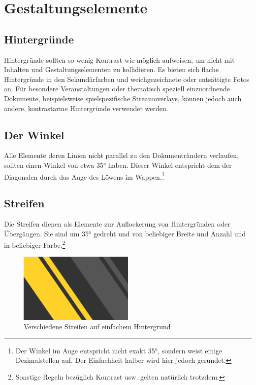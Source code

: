 \documentclass{article}
\begin{document}
\cleardoublepage
\section{Gestaltungselemente}

\subsection{Hintergründe}
Hintergründe sollten so wenig Kontrast wie möglich aufweisen, um nicht mit Inhalten und Gestaltungselementen zu kollidieren. Es bieten sich flache Hintergründe in den Sekundärfarben und weichgezeichnete oder entsättigte Fotos an. Für besondere Veranstaltungen oder thematisch speziell einzuordnende Dokumente, beispielsweise spielspezifische Streamoverlays, können jedoch auch andere, kontrastarme Hintergründe verwendet werden.


\subsection{Der Winkel}
Alle Elemente deren Linien nicht parallel zu den Dokumenträndern verlaufen, sollten einen Winkel von etwa 35° haben. Dieser Winkel entspricht dem der Diagonalen durch das Auge des Löwens im Wappen.\footnote{Der Winkel im Auge entspricht nicht exakt 35°, sondern weist einige Dezimalstellen auf. Der Einfachheit halber wird hier jedoch gerundet.}


\subsection{Streifen}
Die Streifen dienen als Elemente zur Auflockerung von Hintergründen oder Übergängen. Sie sind um 35° gedreht und von beliebiger Breite und Anzahl und in beliebiger Farbe.\footnote{Sonstige Regeln bezüglich Kontrast usw. gelten natürlich trotzdem.}

\begin{figure}[H]
\begin{center}
\includegraphics[width=0.5\textwidth]{Docs/streifen_beispiel.png}
\end{center}
\caption{Verschiedene Streifen auf einfachem Hintergrund}
\end{figure}
\end{document}
